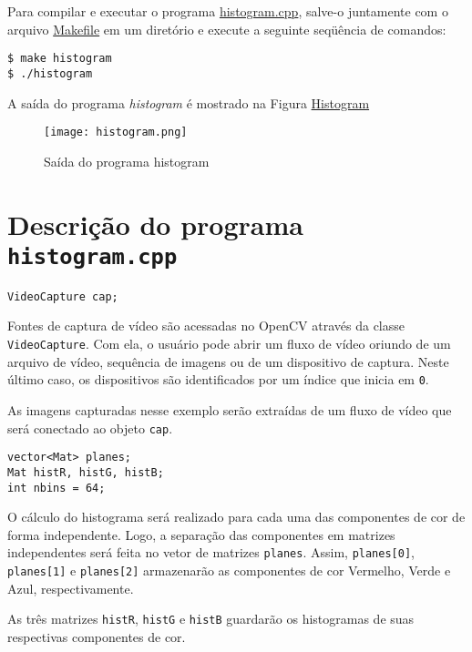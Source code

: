 \documentclass[11pt]{amsbook}
\begin{document}
Para compilar e executar o programa
\href{exemplos/histogram.cpp}{histogram.cpp}, salve-o juntamente com o arquivo
\href{exemplos/Makefile}{Makefile} em um diretório e execute a seguinte
seqüência de comandos:


\begin{verbatim}
$ make histogram
$ ./histogram
\end{verbatim}

A saída do programa \emph{histogram} é mostrado na Figura \hyperlink{fig-histogram}{Histogram}


\begin{figure}[h]{}
\centering\texttt{[image: histogram.png]}
\caption{Saída do programa histogram}

\end{figure}

\hypertarget{x-descrição-do-programa-\texttt{histogram.cpp}}{\section{Descrição do programa \texttt{histogram.cpp}}}
\begin{verbatim}
VideoCapture cap;
\end{verbatim}

Fontes de captura de vídeo são acessadas no OpenCV através da classe
\texttt{VideoCapture}. Com ela, o usuário pode abrir um fluxo de vídeo
oriundo de um arquivo de vídeo, sequência de imagens ou de um
dispositivo de captura. Neste último caso, os dispositivos são
identificados por um índice que inicia em \texttt{0}.


As imagens capturadas nesse exemplo serão extraídas de um fluxo de
vídeo que será conectado ao objeto \texttt{cap}.


\begin{verbatim}
vector<Mat> planes;
Mat histR, histG, histB;
int nbins = 64;
\end{verbatim}

O cálculo do histograma será realizado para cada uma das componentes
de cor de forma independente. Logo, a separação das componentes em
matrizes independentes será feita no vetor de matrizes
\texttt{planes}. Assim, \texttt{planes[0]}, \texttt{planes[1]} e \texttt{planes[2]} armazenarão as
componentes de cor Vermelho, Verde e Azul, respectivamente.


As três matrizes \texttt{histR}, \texttt{histG} e \texttt{histB} guardarão os histogramas
de suas respectivas componentes de cor.
\end{document}
